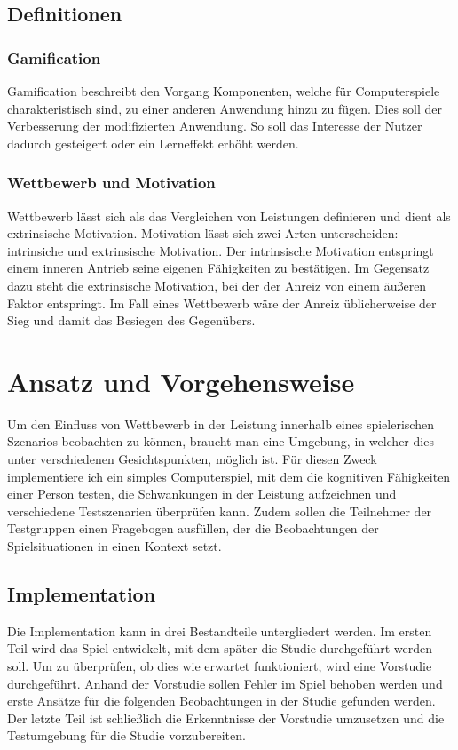 \section{Definitionen}
\subsection{Gamification}
Gamification beschreibt den Vorgang Komponenten, welche für Computerspiele charakteristisch sind, zu einer anderen Anwendung hinzu zu fügen. Dies soll der Verbesserung der modifizierten Anwendung. So soll das Interesse der Nutzer dadurch gesteigert oder ein Lerneffekt erhöht werden.

\subsection{Wettbewerb und Motivation}
Wettbewerb lässt sich als das Vergleichen von Leistungen definieren und dient als extrinsische Motivation. Motivation lässt sich zwei Arten unterscheiden: intrinsiche und extrinsische Motivation.%
Der intrinsische Motivation entspringt einem inneren Antrieb seine eigenen Fähigkeiten zu bestätigen.%
Im Gegensatz dazu steht die extrinsische Motivation, bei der der Anreiz von einem äußeren Faktor entspringt. Im Fall eines Wettbewerb wäre der Anreiz üblicherweise der Sieg und damit das Besiegen des Gegenübers.\cite{Deci1981}




\chapter{Ansatz und Vorgehensweise}
 Um den Einfluss von Wettbewerb in der Leistung innerhalb eines spielerischen Szenarios beobachten zu können, braucht man eine Umgebung, in welcher dies unter verschiedenen Gesichtspunkten, möglich ist. Für diesen Zweck implementiere ich ein simples Computerspiel, mit dem die kognitiven Fähigkeiten einer Person testen, die Schwankungen in der Leistung aufzeichnen und verschiedene Testszenarien überprüfen kann. Zudem sollen die Teilnehmer der Testgruppen einen Fragebogen ausfüllen, der die Beobachtungen der Spielsituationen in einen Kontext setzt.
 
\section{Implementation}
Die Implementation kann in drei Bestandteile untergliedert werden. Im ersten Teil wird das Spiel entwickelt, mit dem später die Studie durchgeführt werden soll. Um zu überprüfen, ob dies wie erwartet funktioniert, wird eine Vorstudie durchgeführt. Anhand der Vorstudie sollen Fehler im Spiel behoben werden und erste Ansätze für die folgenden Beobachtungen in der Studie gefunden werden. Der letzte  Teil ist schließlich die Erkenntnisse der Vorstudie umzusetzen und die Testumgebung für die Studie vorzubereiten.

